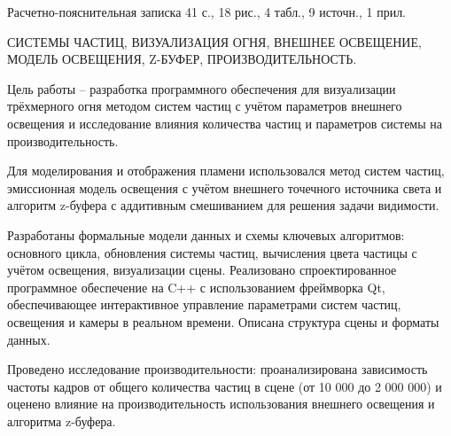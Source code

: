 
Расчетно-пояснительная записка 41 с., 18 рис., 4 табл., 9 источн., 1 прил.

СИСТЕМЫ ЧАСТИЦ, ВИЗУАЛИЗАЦИЯ ОГНЯ, ВНЕШНЕЕ ОСВЕЩЕНИЕ, МОДЕЛЬ ОСВЕЩЕНИЯ, Z-БУФЕР, ПРОИЗВОДИТЕЛЬНОСТЬ.

Цель работы – разработка программного обеспечения для визуализации трёхмерного огня методом систем частиц с учётом параметров внешнего освещения и исследование влияния количества частиц и параметров системы на производительность.

Для моделирования и отображения пламени использовался метод систем частиц, эмиссионная модель освещения с учётом внешнего точечного источника света и алгоритм z-буфера с аддитивным смешиванием для решения задачи видимости.

Разработаны формальные модели данных и схемы ключевых алгоритмов: основного цикла, обновления системы частиц, вычисления цвета частицы с учётом освещения, визуализации сцены. Реализовано спроектированное программное обеспечение на C++ с использованием фреймворка Qt, обеспечивающее интерактивное управление параметрами систем частиц, освещения и камеры в реальном времени. Описана структура сцены и форматы данных.

Проведено исследование производительности: проанализирована зависимость частоты кадров от общего количества частиц в сцене (от 10 000 до 2 000 000) и оценено влияние на производительность использования внешнего освещения и алгоритма z-буфера.

\clearpage
